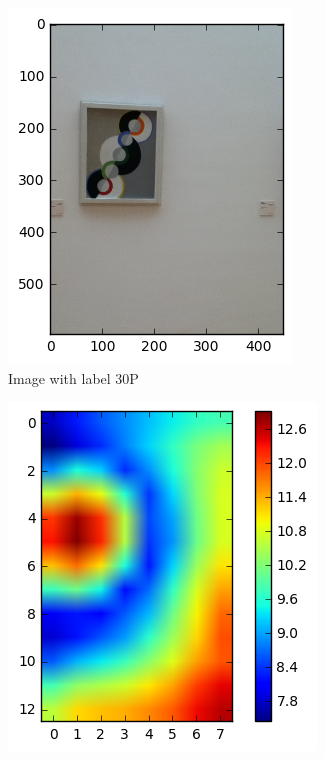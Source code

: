 \begin{figure}
\begin{subfigure}[b]{0.3\textwidth}
\includegraphics[width=\textwidth]{img/sample3_30P-0976.png}
\caption{Image with label 30P\label{fig:sample3_id}}
\end{subfigure}
\begin{subfigure}[b]{0.3\textwidth}
\includegraphics[width=\textwidth]{img/sample3_heatmap.png}

\end{subfigure}
\end{figure}
